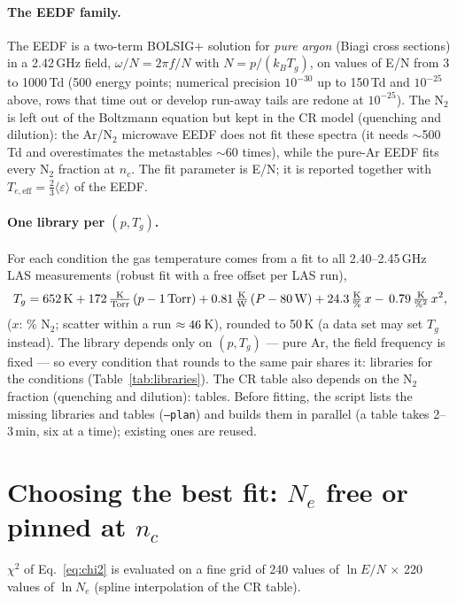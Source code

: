 \documentclass[11pt]{article}
\newcommand{\EN}{E/N}
\newcommand{\Teff}{T_{e,\mathrm{eff}}}
\newcommand{\nc}{n_c}
\begin{document}
\paragraph{The EEDF family.} The EEDF is a two-term BOLSIG+ solution for \emph{pure argon} (Biagi cross sections)
in a 2.42\,GHz field, $\omega/N = 2\pi f/N$ with $N=p/(k_BT_g)$, on \NEN{} values of \EN{} from 3 to 1000\,Td (500
energy points; numerical precision $10^{-30}$ up to 150\,Td and $10^{-25}$ above, rows that time out or develop
run-away tails are redone at $10^{-25}$). The N$_2$ is left out of the Boltzmann equation but kept in the CR model
(quenching and dilution): the Ar/N$_2$ microwave EEDF does not fit these spectra (it needs $\sim$500\,Td and
overestimates the metastables $\sim$60 times), while the pure-Ar EEDF fits every N$_2$ fraction at $\nc$. The fit
parameter is \EN; it is reported together with $\Teff = \tfrac23\langle\varepsilon\rangle$ of the EEDF.

\paragraph{One library per $(p, T_g)$.} For each condition the gas temperature comes from a fit to all
2.40--2.45\,GHz LAS measurements (robust fit with a free offset per LAS run),
\begin{equation}
T_g = 652\,\mathrm{K} + 172\,\tfrac{\mathrm K}{\mathrm{Torr}}\,(p - 1\,\mathrm{Torr})
      + 0.81\,\tfrac{\mathrm K}{\mathrm W}\,(P - 80\,\mathrm W) + 24.3\,\tfrac{\mathrm K}{\%}\,x
      -\,0.79\,\tfrac{\mathrm K}{\%^2}\,x^2 ,
\end{equation}
($x$: \% N$_2$; scatter within a run $\approx46$\,K), rounded to 50\,K (a data set may set $T_g$ instead).
The library depends only on $(p, T_g)$ --- pure Ar, the field frequency is fixed --- so every condition that rounds
to the same pair shares it: \NLib{} libraries for the \NCond{} conditions (Table~\ref{tab:libraries}). The CR table
also depends on the N$_2$ fraction (quenching and dilution): \NTab{} tables. Before fitting, the script lists the
missing libraries and tables (\texttt{--plan}) and builds them in parallel (a table takes 2--3\,min, six at a time);
existing ones are reused.

\section{Choosing the best fit: $N_e$ free or pinned at $\nc$}
\label{sec:fit}
$\chi^2$ of Eq.~\eqref{eq:chi2} is evaluated on a fine grid of 240 values of $\ln\EN$ $\times$ 220 values of
$\ln N_e$ (spline interpolation of the CR table).
\end{document}
